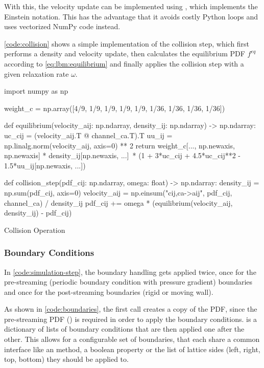With this, the velocity update can be implemented using , which implements the Einstein notation. This has the advantage that it avoids costly Python loops and uses vectorized NumPy code instead.

\cref{code:collision} shows a simple implementation of the collision step, which first performs a density and velocity update, then calculates the equilibrium \gls{PDF} $f^{eq}$ according to \cref{eq:lbm:equilibrium} and finally applies the collision step with a given relaxation rate $\omega$.

\begin{listing}[ht!]
    \begin{pycode}
        import numpy as np
    
        weight_c = np.array([4/9, 1/9, 1/9, 1/9, 1/9, 1/36, 1/36, 1/36, 1/36])
    
        def equilibrium(velocity_aij: np.ndarray, density_ij: np.ndarray) -> np.ndarray:
            uc_cij = (velocity_aij.T @ channel_ca.T).T
            uu_ij = np.linalg.norm(velocity_aij, axis=0) ** 2
            return weight_c[..., np.newaxis, np.newaxis] * density_ij[np.newaxis, ...]\
                * (1 + 3*uc_cij + 4.5*uc_cij**2 - 1.5*uu_ij[np.newaxis, ...])
    
        def collision_step(pdf_cij: np.ndarray, omega: float) -> np.ndarray:
            density_ij = np.sum(pdf_cij, axis=0)
            velocity_aij = np.einsum("cij,ca->aij", pdf_cij, channel_ca) / density_ij
            pdf_cij += omega * (equilibrium(velocity_aij, density_ij) - pdf_cij)
    \end{pycode}
    \caption{Collision Operation}
    \label{code:collision}
\end{listing}

\subsubsection{Boundary Conditions}

In \cref{code:simulation-step}, the boundary handling gets applied twice, once for the pre-streaming (periodic boundary condition with pressure gradient) boundaries and once for the post-streaming boundaries (rigid or moving wall).

As shown in \cref{code:boundaries}, the first call creates a copy of the \gls{PDF}, since the pre-streaming \gls{PDF} () is required in order to apply the boundary conditions.  is a dictionary of lists of boundary conditions that are then applied one after the other. This allows for a configurable set of boundaries, that each share a common interface like an  method, a boolean  property or the list of lattice sides (left, right, top, bottom) they should be applied to.

